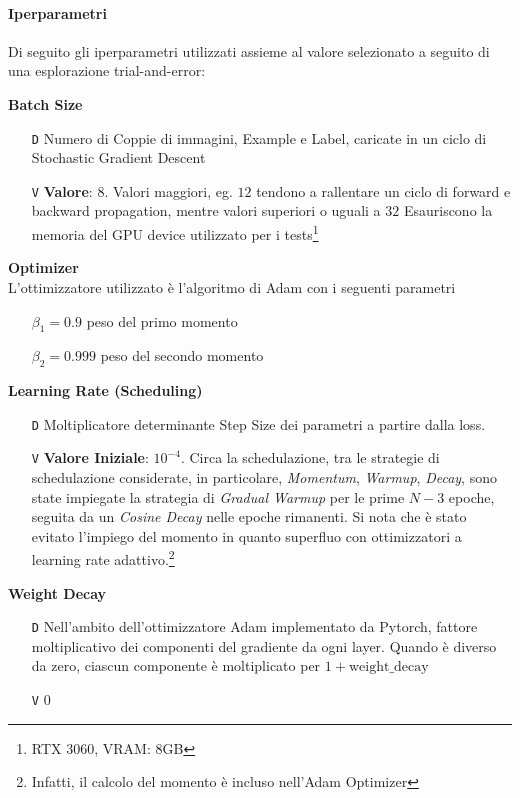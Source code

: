 \documentclass[a4paper,10pt,twocolumn]{article}
\begin{document}
\paragraph{Iperparametri}

Di seguito gli iperparametri utilizzati assieme al valore selezionato a seguito di una esplorazione trial-and-error:

\textbf{Batch Size}
\begin{itemize}[topsep=0pt, noitemsep]
  \item[\texttt{D}] Numero di Coppie di immagini, Example e Label, caricate in un ciclo di Stochastic Gradient Descent
  \item[\texttt{V}] \textbf{Valore}: $8$. Valori maggiori, eg. $12$ tendono a rallentare un ciclo di forward e backward propagation,
    mentre valori superiori o uguali a $32$ Esauriscono la
    memoria del GPU device utilizzato per i tests\footnote{RTX 3060, VRAM: 8GB}\\
\end{itemize}

\textbf{Optimizer}\\
\hspace{1em}L'ottimizzatore utilizzato \`e l'algoritmo di Adam con i seguenti parametri
\begin{itemize}[topsep=0pt, noitemsep]
  \item[] $\beta_1 = 0.9$ peso del primo momento
  \item[] $\beta_2 = 0.999$ peso del secondo momento
\end{itemize}

\textbf{Learning Rate (Scheduling)}
\begin{itemize}[topsep=0pt, noitemsep]
  \item[\texttt{D}] Moltiplicatore determinante Step Size dei parametri a partire dalla loss.
  \item[\texttt{V}] \textbf{Valore Iniziale}: $10^{-4}$. Circa la schedulazione, tra le strategie di schedulazione considerate,
    in particolare, \textit{Momentum}, \textit{Warmup}, \textit{Decay}, sono state impiegate la strategia di \textit{Gradual Warmup}
    per le prime $N - 3$ epoche, seguita da un \textit{Cosine Decay} nelle
    epoche rimanenti. Si nota che \`e stato evitato l'impiego del momento in quanto superfluo con ottimizzatori a learning
    rate adattivo.\footnote{Infatti, il calcolo del momento \`e incluso nell'Adam Optimizer}
\end{itemize}

\textbf{Weight Decay}
\begin{itemize}[topsep=0pt, noitemsep]
  \item[\texttt{D}] Nell'ambito dell'ottimizzatore Adam implementato da Pytorch, fattore moltiplicativo dei componenti del gradiente da
  ogni layer.  Quando \`e diverso da zero, ciascun componente \`e moltiplicato per $1 + \mathrm{weight\_decay}$
  \item[\texttt{V}] $0$
\end{itemize}
\end{document}

